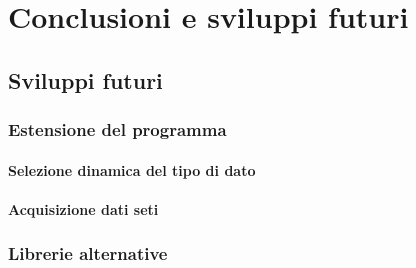 \chapter{Conclusioni e sviluppi futuri}
\label{conclusions}
\section{Sviluppi futuri}
\subsection{Estensione del programma}
\subsubsection{Selezione dinamica del tipo di dato}
\label{dyn_dtype}
\subsubsection{Acquisizione dati \ac{seti}}
\label{seti}
\subsection{Librerie alternative}
\label{altlib}
